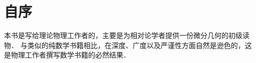 

%
%



\section*{自序}


本书是写给理论物理工作者的，主要是为相对论学者提供一份微分几何的{\kaishu 初级}读物．
与类似的纯数学书籍相比，在深度、广度以及严谨性方面自然是逊色的，这是物理工作者撰写数学书籍的必然结果．


%
%
%
%



